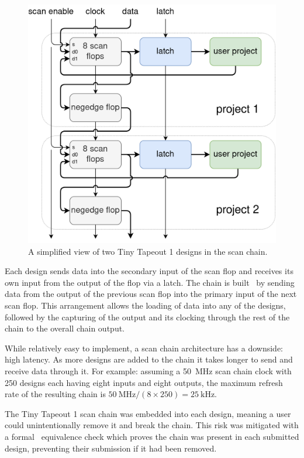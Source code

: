 \begin{figure}[!t]
\centering
\includegraphics[width=\columnwidth]{./Figs/scanchain_block_diagram.png}
\caption{A simplified view of two Tiny Tapeout 1 designs in the scan chain.}
\label{fig:simplified_view_2_designs}
\end{figure}

Each design sends data into the secondary input of the scan flop and receives its own input from the output of the flop via a latch.
The chain is built~\cite{updateiodesign} by sending data from the output of the previous scan flop into the primary input of the next scan flop.
This arrangement allows the loading of data into any of the designs, followed by the capturing of the output and its clocking through the rest of the chain to the overall chain output.

While relatively easy to implement, a scan chain architecture has a downside: high latency.
As more designs are added to the chain it takes longer to send and receive data through it.
For example: assuming a \qty{50}{\MHz} scan chain clock with 250 designs each having eight inputs and eight outputs, the maximum refresh rate of the resulting chain is $\qty{50}{\MHz} / (8 \times 250) = \qty{25}{\kHz}$.

The Tiny Tapeout 1 scan chain was embedded into each design, meaning a user could unintentionally remove it and break the chain.
This risk was mitigated with a formal~\cite{tinytapeoutscan} equivalence check which proves the chain was present in each submitted design, preventing their submission if it had been removed.

